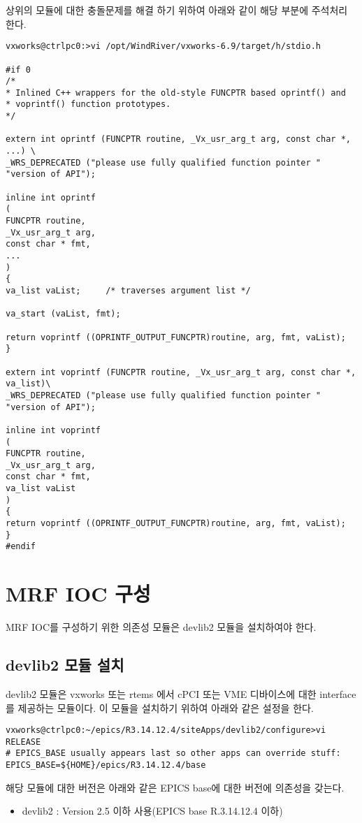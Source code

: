 \documentclass[11pt
  , a4paper
  , article
  , oneside
]{memoir}
\begin{document}
상위의 모듈에 대한 충돌문제를 해결 하기 위하여 아래와 같이 해당 부분에 주석처리 한다.
\begin{lstlisting}[style=termstyle]
vxworks@ctrlpc0:>vi /opt/WindRiver/vxworks-6.9/target/h/stdio.h

#if 0
/*
* Inlined C++ wrappers for the old-style FUNCPTR based oprintf() and
* voprintf() function prototypes.
*/

extern int oprintf (FUNCPTR routine, _Vx_usr_arg_t arg, const char *, ...) \
_WRS_DEPRECATED ("please use fully qualified function pointer "
"version of API");

inline int oprintf
(
FUNCPTR routine,
_Vx_usr_arg_t arg,
const char * fmt,
...
)
{
va_list vaList;     /* traverses argument list */

va_start (vaList, fmt);

return voprintf ((OPRINTF_OUTPUT_FUNCPTR)routine, arg, fmt, vaList);
}

extern int voprintf (FUNCPTR routine, _Vx_usr_arg_t arg, const char *, va_list)\
_WRS_DEPRECATED ("please use fully qualified function pointer "
"version of API");

inline int voprintf
(
FUNCPTR routine,
_Vx_usr_arg_t arg,
const char * fmt,
va_list vaList
)
{
return voprintf ((OPRINTF_OUTPUT_FUNCPTR)routine, arg, fmt, vaList);
}
#endif

\end{lstlisting}
 

\chapter{MRF IOC 구성}
MRF IOC를 구성하기 위한 의존성 모듈은 devlib2 모듈을 설치하여야 한다.

\section{devlib2 모듈 설치}
devlib2 모듈은 vxworks 또는 rtems 에서 cPCI 또는 VME 디바이스에 대한 interface를 제공하는 모듈이다. 이 모듈을 설치하기 위하여
아래와 같은 설정을 한다.

\begin{lstlisting}[style=termstyle]
vxworks@ctrlpc0:~/epics/R3.14.12.4/siteApps/devlib2/configure>vi RELEASE
# EPICS_BASE usually appears last so other apps can override stuff:
EPICS_BASE=${HOME}/epics/R3.14.12.4/base
\end{lstlisting}

해당 모듈에 대한 버전은 아래와 같은 EPICS base에 대한 버전에 의존성을 갖는다. 
\begin{itemize}
	\item devlib2 : Version 2.5 이하 사용(EPICS base R.3.14.12.4 이하)
\end{itemize}
\end{document}
